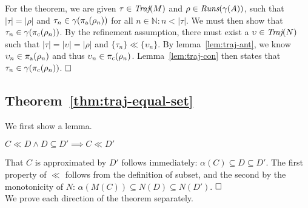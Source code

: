 
For the theorem, we are given $\tau \in \operatorname{\textit{Traj}}(M)$ and $\rho \in \operatorname{\textit{Runs}}(\gamma(A))$, such that $| \tau | = | \rho |$ and $\tau_{n} \in \gamma(\operatorname{\pi_{\textrm{a}}}(\rho_{n}))$ for all $n \in \mathbb{N} : n < | \tau |$. We must then show that $\tau_{n} \in \gamma(\operatorname{\pi_{\textrm{c}}}(\rho_{n}))$. By the refinement assumption, there must exist a $\upsilon \in \operatorname{\textit{Traj}}(N)$ such that $| \tau | = | \upsilon | = | \rho |$ and $\{ \tau_{n} \} \ll \{ \upsilon_{n} \}$. By lemma~\ref{lem:traj-ant}, we know $\upsilon_{n} \in \operatorname{\pi_{\textrm{a}}}(\rho_{n})$ and thus $\upsilon_{n} \in \operatorname{\pi_{\textrm{c}}}(\rho_{n})$. Lemma~\ref{lem:traj-con} then states that $\tau_{n} \in \gamma(\operatorname{\pi_{\textrm{c}}}(\rho_{n}))$. $\qedbox$

\subsection{Theorem~\ref{thm:traj-equal-set}}

We first show a lemma.

\begin{lemma} \label{lem:ll-sub}
$C \ll D \wedge D \subseteq D' \implies C \ll D'$
\end{lemma}

That $C$ is approximated by $D'$ follows immediately: $\alpha(C) \subseteq D \subseteq D'$. The first property of $\ll$ follows from the definition of subset, and the second by the monotonicity of $N$: $\alpha(M(C)) \subseteq N(D) \subseteq N(D')$. $\qedbox$
\\

We prove each direction of the theorem separately.

